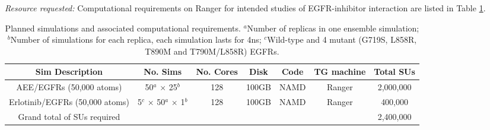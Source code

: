 \emph{Resource requested:} Computational requirements on Ranger for intended studies of EGFR-inhibitor interaction are listed in Table \ref{t:efgr}.

\begin{table}[h]
\centering
\begin{tabular}[b]
{|>{\scriptsize}c|>{\scriptsize}c|>{\scriptsize}
c|>{\scriptsize}c|>{\scriptsize}c|>{\scriptsize}c|>{\scriptsize}c|}
\hline
\textbf{Sim Description} & \textbf{No. Sims} &
\textbf{No. Cores} & \textbf{Disk} &
\textbf{Code} & \textbf{TG machine} & \textbf{Total SUs}\\
\hline
AEE/EGFRs (50,000 atoms) & 50$^a$ $\times$ 25$^b$ & 128 & 100GB & NAMD & Ranger & 2,000,000\\
\hline
Erlotinib/EGFRs (50,000 atoms) & 5$^c$ $\times$ 50$^a$ $\times$ 1$^b$ & 128 & 100GB & NAMD & Ranger & 400,000\\
\hline
Grand total of SUs required & & & & & & 2,400,000 \\
\hline
\end{tabular} \caption{Planned simulations and associated computational requirements. $^a$Number of replicas in one ensemble simulation; $^b$Number of simulations for each replica, each simulation lasts for 4ns; $^c$Wild-type and 4 mutant (G719S, L858R, T890M and T790M/L858R) EGFRs.}
\label{t:efgr}
\end{table}
